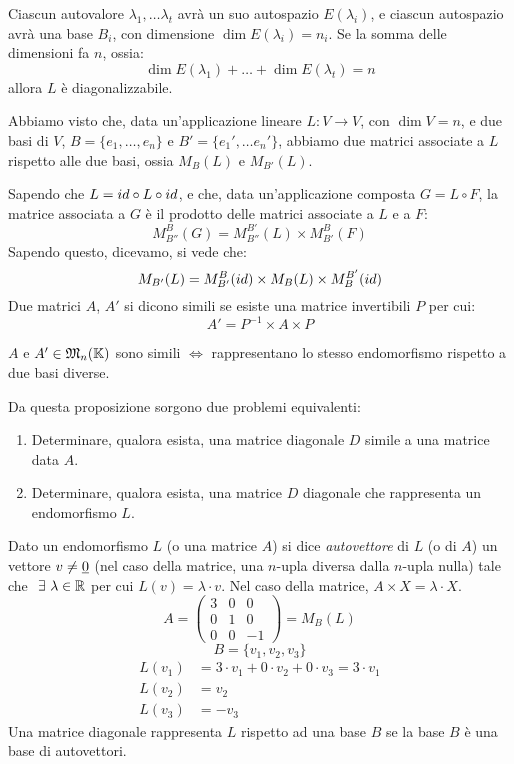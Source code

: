 Ciascun autovalore $\lambda_1, \ldots \lambda_t$ avr\`a un suo autospazio $E(\lambda_i)$, e ciascun autospazio avr\`a una base $B_i$, con dimensione $\dim E(\lambda_i) = n_i$. Se la somma delle dimensioni fa $n$, ossia:
\[
\dim E(\lambda_1) + \ldots + \dim E(\lambda_t) = n
\]
allora $L$ \`e diagonalizzabile.

Abbiamo visto che, data un'applicazione lineare $L : V \to V$, con $\dim V = n$, e due basi di $V$, $B = \{ e_1, \ldots, e_n \}$ e $B' = \{ e_1', \ldots e_{n}' \}$, abbiamo due matrici associate a $L$ rispetto alle due basi, ossia $M_{B}(L)$ e $M_{B'}(L)$.

Sapendo che $L = id \circ L \circ id$, e che, data un'applicazione composta $G = L \circ F$, la matrice associata a $G$ \`e il prodotto delle matrici associate a $L$ e a $F$:
\[
M_{B''}^{B} (G) = M_{B''}^{B'} (L) \times M_{B'}^{B} (F)
\]
Sapendo questo, dicevamo, si vede che:
\[
M_{B'} (L) = M_{B'}^{B} ( id ) \times M_{B} (L) \times M_{B}^{B'} (id)
\]
Due matrici $A$, $A'$ si dicono simili se esiste una matrice invertibili $P$ per cui:
\[
A' = P^{-1} \times A \times P
\]
\begin{prop}
$A$ e $A' \in \mathfrak{M}_{n} (\mathbb{K})$ sono simili $\iff$ rappresentano lo stesso endomorfismo rispetto a due basi diverse.
\end{prop}
Da questa proposizione sorgono due problemi equivalenti:
\begin{enumerate}
    \item Determinare, qualora esista, una matrice diagonale $D$ simile a una matrice data $A$.
    \item Determinare, qualora esista, una matrice $D$ diagonale che rappresenta un endomorfismo $L$.
\end{enumerate}

Dato un endomorfismo $L$ (o una matrice $A$) si dice \emph{autovettore} di $L$ (o di $A$) un vettore $v \neq \underline{0}$ (nel caso della matrice, una $n$-upla diversa dalla $n$-upla nulla) tale che $\exists \lambda \in \reals$ per cui $L(v) = \lambda \cdot v$. Nel caso della matrice, $A \times X = \lambda \cdot X$.
\[
A =
\begin{pmatrix}
3 & 0 & 0 \\ 
0 & 1 & 0 \\
0 & 0 & -1
\end{pmatrix}
=
M_B(L)
\]
\[
B = \{ v_1, v_2, v_3 \}
\]
\begin{align*}
L(v_1) &= 3 \cdot v_1 + 0 \cdot v_2 + 0 \cdot v_3 = 3 \cdot v_1 \\
L(v_2) &= v_2 \\
L(v_3) &= - v_3
\end{align*}
Una matrice diagonale rappresenta $L$ rispetto ad una base $B$ se la base $B$ \`e una base di autovettori.

